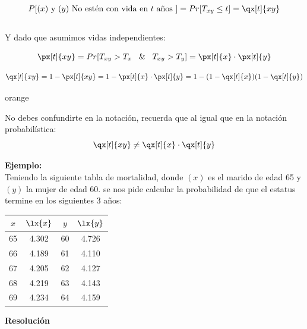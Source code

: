 \documentclass[12pt, a4paper, footinclude=true]{scrbook}
\newenvironment{advertencia}{
	\begin{calloutbase}{orange}
	}{
	\end{calloutbase}
}
\begin{document}
$$P[(x) \text{ y } (y) \text{ No estén con vida en } t \text{ años } ] = Pr[T_{xy} \leq t] = \qx[t]{xy}$$ \\

Y dado que asumimos vidas independientes:

$$\px[t]{xy} = Pr[T_{xy} > T_x \hspace{.3cm} \& \hspace{.3cm} T_{xy} > T_y] = \px[t]{x} \cdot \px[t]{y}$$

$$\qx[t]{xy} = 1 - \px[t]{xy} = 1 - \px[t]{x} \cdot \px[t]{y} = 1 - (1 - \qx[t]{x})(1-\qx[t]{y})$$

\begin{advertencia}
	No debes confundirte en la notación, recuerda que al igual que en la notación probabilística: $$\qx[t]{xy} \neq \qx[t]{x} \cdot \qx[t]{y}$$
\end{advertencia}



\textbf{Ejemplo:}\\

Teniendo la siguiente tabla de mortalidad, donde $(x)$ es el marido de edad 65 y $(y)$ la mujer de edad 60. se nos pide calcular la probabilidad de que el estatus termine en los siguientes 3 años: \\

\begin{center}
\begin{tabular}{c|c|c|c}
	
	$x$ & $\lx{x}$ & $y$ & $\lx{y}$ \\
	\hline
	65 & 4.302 & 60 & 4.726 \\
	66 & 4.189 & 61 & 4.110 \\
	67 & 4.205 & 62 & 4.127 \\
	68 & 4.219 & 63 & 4.143 \\
	69 & 4.234 & 64 & 4.159 \\
	
\end{tabular}
\end{center}

\textbf{Resolución}\\
\end{document}
